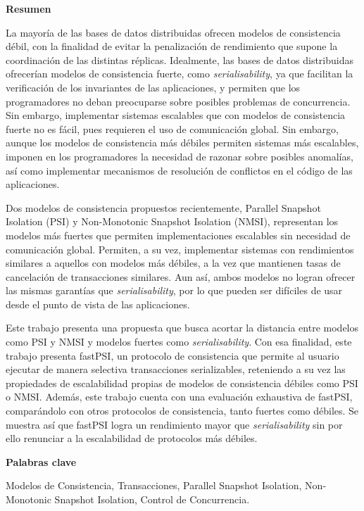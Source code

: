 \newpage

\begin{center}
{\bf \Huge Resumen}
\end{center}

\vspace{1cm}

La mayoría de las bases de datos distribuidas ofrecen modelos de consistencia
débil, con la finalidad de evitar la penalización de rendimiento que supone la
coordinación de las distintas réplicas. Idealmente, las bases de datos distribuidas
ofrecerían modelos de consistencia fuerte, como \emph{serialisability}, ya que
facilitan la verificación de los invariantes de las aplicaciones, y permiten que
los programadores no deban preocuparse sobre posibles problemas de concurrencia.
Sin embargo, implementar sistemas escalables que con modelos de consistencia
fuerte no es fácil, pues requieren el uso de comunicación global. Sin embargo,
aunque los modelos de consistencia más débiles permiten sistemas más escalables,
imponen en los programadores la necesidad de razonar sobre posibles anomalías,
así como implementar mecanismos de resolución de conflictos en el código de las
aplicaciones.

Dos modelos de consistencia propuestos recientemente, Parallel Snapshot Isolation
(PSI) y Non-Monotonic Snapshot Isolation (NMSI), representan los modelos más
fuertes que permiten implementaciones escalables sin necesidad de comunicación
global. Permiten, a su vez, implementar sistemas con rendimientos similares a
aquellos con modelos más débiles, a la vez que mantienen tasas de cancelación de
transacciones similares. Aun así, ambos modelos no logran ofrecer las mismas
garantías que \emph{serialisability}, por lo que pueden ser difíciles de usar desde el
punto de vista de las aplicaciones.

Este trabajo presenta una propuesta que busca acortar la distancia entre
modelos como PSI y NMSI y modelos fuertes como \emph{serialisability}. Con esa
finalidad, este trabajo presenta fastPSI, un protocolo de consistencia que permite
al usuario ejecutar de manera selectiva transacciones serializables, reteniendo a
su vez las propiedades de escalabilidad propias de modelos de consistencia débiles
como PSI o NMSI. Además, este trabajo cuenta con una evaluación exhaustiva de
fastPSI, comparándolo con otros protocolos de consistencia, tanto fuertes como
débiles. Se muestra así que fastPSI logra un rendimiento mayor que
\emph{serialisability} sin por ello renunciar a la escalabilidad de protocolos
más débiles.

\vspace{1cm}

\begin{center}
{\bf \Large Palabras clave}
\end{center}

\vspace{0.5cm}

Modelos de Consistencia, Transacciones, Parallel Snapshot Isolation,
Non-Monotonic Snapshot Isolation, Control de Concurrencia.
